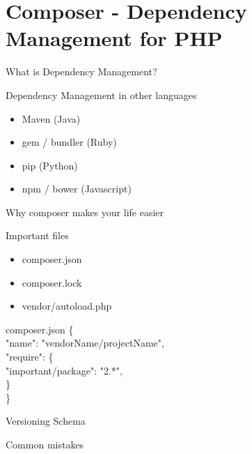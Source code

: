 \section{Composer - Dependency Management for PHP}

\begin{frame}{What is Dependency Management?}
\end{frame}

\begin{frame}{Dependency Management in other languages}
	\begin{itemize}
		\item Maven (Java)
		\item gem / bundler (Ruby)
		\item pip (Python)
		\item npm / bower (Javascript)
	\end{itemize}
\end{frame}

\begin{frame}{Why composer makes your life easier}
\end{frame}


\begin{frame}{Important files}
	\begin{itemize}
		\item composer.json
		\item composer.lock
		\item vendor/autoload.php
	\end{itemize}
\end{frame}

\begin{frame}{composer.json}
	\{ ~\\
		\hspace{1cm}"name": "vendorName/projectName", ~\\
		\hspace{1cm}"require": \{ ~\\
		\hspace{2cm}"important/package": "2.*", ~\\
		\hspace{1cm}\} ~\\
	\} ~\\
\end{frame}

\begin{frame}{Versioning Schema}
\end{frame}

\begin{frame}{Common mistakes}
\end{frame}